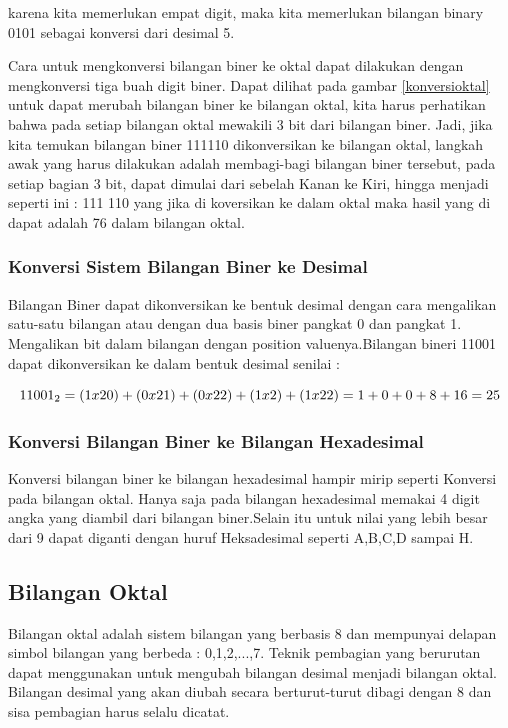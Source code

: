 karena kita memerlukan empat digit, maka kita memerlukan bilangan binary 0101 sebagai konversi dari desimal 5.

Cara untuk mengkonversi bilangan biner ke oktal dapat dilakukan dengan mengkonversi tiga buah digit biner. Dapat dilihat pada gambar \ref{konversioktal} untuk dapat merubah bilangan biner ke bilangan oktal, kita harus perhatikan bahwa pada setiap bilangan oktal mewakili 3 bit dari bilangan biner. Jadi, jika kita temukan bilangan biner 111110 dikonversikan ke bilangan oktal, langkah awak yang harus dilakukan adalah membagi-bagi bilangan biner tersebut, pada setiap bagian 3 bit, dapat dimulai dari sebelah Kanan ke Kiri, hingga menjadi seperti ini : 111 110 yang jika di koversikan ke dalam oktal maka hasil yang di dapat adalah 76 dalam bilangan oktal.

\subsubsection{Konversi Sistem Bilangan Biner ke Desimal}
Bilangan Biner dapat dikonversikan ke bentuk desimal dengan cara mengalikan satu-satu bilangan atau dengan dua basis biner pangkat 0 dan pangkat 1. Mengalikan bit dalam bilangan dengan position valuenya.Bilangan bineri 11001 dapat dikonversikan ke dalam bentuk desimal senilai : \break 

\begin{equation}
11001_{2} = (1x20)+(0x21)+(0x22)+(1x2)+(1x22) \break 
= 1+0+0+8+16 
= 25
\end{equation}

\subsubsection{Konversi Bilangan Biner ke Bilangan Hexadesimal}
Konversi bilangan biner ke bilangan hexadesimal hampir mirip seperti Konversi pada bilangan oktal. Hanya saja pada bilangan hexadesimal memakai 4 digit angka yang diambil dari bilangan biner.Selain itu untuk nilai yang lebih besar dari 9 dapat diganti dengan huruf Heksadesimal seperti A,B,C,D sampai H. 
\subsection{Bilangan Oktal}
Bilangan oktal adalah sistem bilangan yang berbasis 8 dan mempunyai delapan simbol bilangan yang berbeda : 0,1,2,...,7.
Teknik pembagian yang berurutan dapat menggunakan untuk mengubah bilangan desimal menjadi bilangan oktal. Bilangan desimal yang akan diubah secara berturut-turut dibagi dengan 8 dan sisa pembagian harus selalu dicatat. 
